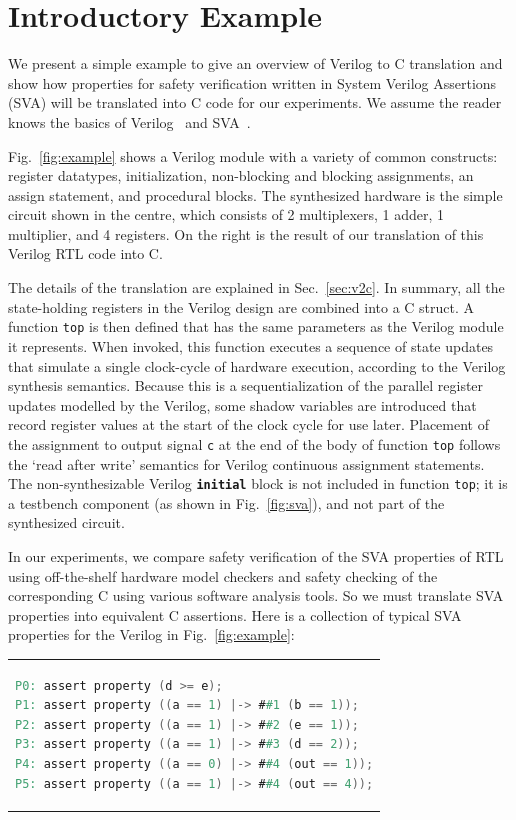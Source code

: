 \section{Introductory Example} 

We present a simple example to give an overview of Verilog to C translation and show how properties for safety verification written in System Verilog Assertions (SVA) will be translated into C code for our experiments. We assume the reader knows the basics of Verilog~\cite{verilog} and SVA~\cite{sva_ref}. 

Fig.\ \ref{fig:example} shows a Verilog module with a variety of common constructs: register datatypes, initialization, non-blocking and blocking assignments, an assign statement, and procedural blocks.  The synthesized hardware is the simple circuit shown in the centre, which consists of 2 multiplexers, 1 adder, 1 multiplier, and 4 registers.  On the right is the result of our translation of this Verilog RTL code into C.

The details of the translation are explained in Sec.\ \ref{sec:v2c}. In summary, all the state-holding registers in the Verilog design are combined into a C struct. A function \texttt{top} is then defined that has the same parameters as the Verilog module it represents. When invoked, this function executes a sequence of state updates that simulate a single clock-cycle of hardware execution, according to the Verilog synthesis semantics. Because this is a sequentialization of the parallel register updates modelled by the Verilog, some shadow variables are introduced that record register values at the start of the clock cycle for use later.  Placement of the assignment to output signal \texttt{c} at the end of the body of function \texttt{top} follows the `read after write' semantics for Verilog continuous assignment statements.  
The non-synthesizable Verilog {\bf\texttt{initial}} block is not included in function \texttt{top}; it is a testbench component (as shown in Fig.\ \ref{fig:sva}), and not part of the synthesized circuit.   

In our experiments, we compare safety verification of the SVA properties of RTL using 
off-the-shelf hardware model checkers and safety checking of the corresponding C using 
various software analysis tools.  So we must translate SVA properties into equivalent C 
assertions. Here is a collection of typical SVA properties for the Verilog in Fig.\ \ref{fig:example}:

\begin{center}
\begin{tabular}[t]{@{}l@{}}
\begin{lstlisting}[mathescape=true,language=Verilog,basicstyle=\scriptsize\ttfamily]
P0: assert property (d >= e);
P1: assert property ((a == 1) |-> ##1 (b == 1));
P2: assert property ((a == 1) |-> ##2 (e == 1));
P3: assert property ((a == 1) |-> ##3 (d == 2));
P4: assert property ((a == 0) |-> ##4 (out == 1));
P5: assert property ((a == 1) |-> ##4 (out == 4));
\end{lstlisting}
\end{tabular}
\end{center}

